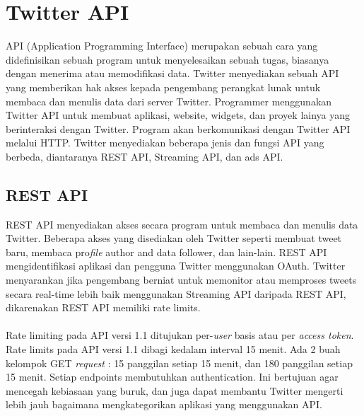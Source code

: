 \section{Twitter API}
API (Application Programming Interface) merupakan sebuah cara yang didefinisikan sebuah program untuk
menyelesaikan sebuah tugas, biasanya dengan menerima atau memodifikasi data. Twitter menyediakan
sebuah API yang memberikan hak akses kepada pengembang perangkat lunak untuk membaca dan menulis data dari server Twitter. Programmer menggunakan Twitter API untuk membuat aplikasi, website, widgets, dan proyek lainya yang berinteraksi dengan Twitter. Program akan berkomunikasi dengan Twitter API melalui HTTP. Twitter menyediakan beberapa jenis dan fungsi API yang berbeda, diantaranya REST API, Streaming API, dan ads API.
\subsection{REST API}
REST API menyediakan akses secara program untuk membaca dan menulis data Twitter. Beberapa akses yang disediakan oleh Twitter seperti membuat tweet baru, membaca pro\textit{file} author and data follower, dan lain-lain. REST API mengidentifikasi aplikasi dan pengguna Twitter menggunakan OAuth. Twitter menyarankan jika pengembang berniat untuk memonitor atau memproses tweets secara real-time lebih baik menggunakan Streaming API daripada REST API, dikarenakan REST API memiliki rate limits.\\\\
Rate limiting pada API versi 1.1 ditujukan per-\textit{user} basis atau per \textit{access token}. Rate limits pada API versi 1.1 dibagi kedalam interval 15 menit. Ada 2 buah kelompok GET \textit{request} : 15 panggilan setiap 15 menit, dan 180 panggilan setiap 15 menit. Setiap endpoints membutuhkan authentication. Ini bertujuan agar mencegah kebiasaan yang buruk, dan juga dapat membantu Twitter mengerti lebih jauh bagaimana mengkategorikan aplikasi yang menggunakan API.

